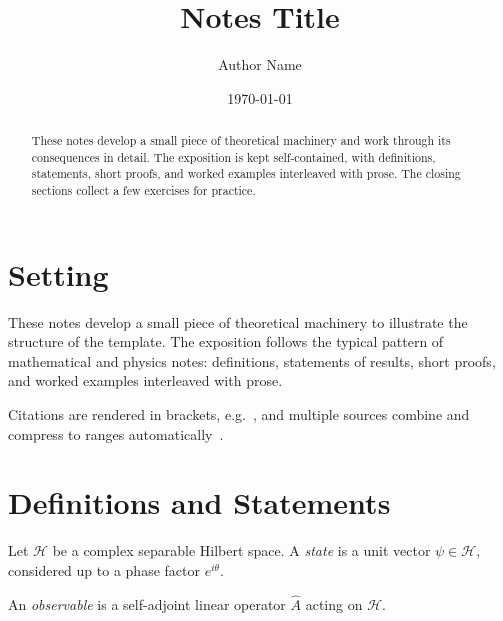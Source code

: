 \documentclass[a4paper,11pt]{article}
\title{Notes Title}
\author{Author Name}
\date{\today}
\begin{document}
\maketitle

\begin{abstract}
These notes develop a small piece of theoretical machinery and work through its consequences in detail. The exposition is kept self-contained, with definitions, statements, short proofs, and worked examples interleaved with prose. The closing sections collect a few exercises for practice.
\end{abstract}

\clearpage
\framedtoc
\clearpage


\section{Setting}

These notes develop a small piece of theoretical machinery to illustrate the structure of the template. The exposition follows the typical pattern of mathematical and physics notes: definitions, statements of results, short proofs, and worked examples interleaved with prose.

Citations are rendered in brackets, e.g.\ \cite{example-article}, and multiple sources combine and compress to ranges automatically~\cite{example-article,example-book}.


\section{Definitions and Statements}

\begin{important}
\begin{definition}
  Let $\mathcal{H}$ be a complex separable Hilbert space. A \emph{state} is a unit vector $\psi \in \mathcal{H}$, considered up to a phase factor $e^{i\theta}$.
\end{definition}
\end{important}

\begin{definition}
  An \emph{observable} is a self-adjoint linear operator $\hat{A}$ acting on $\mathcal{H}$.
\end{definition}
\end{document}
